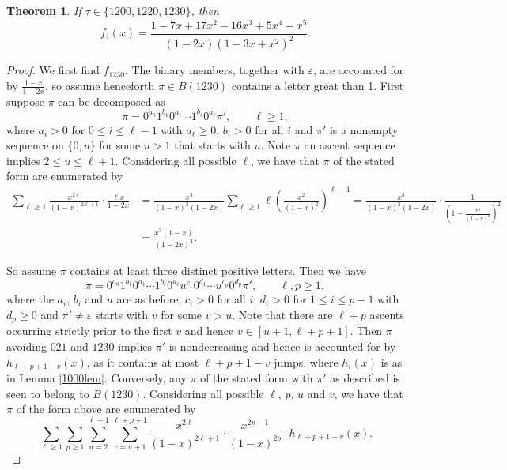 \documentclass{article}
\theoremstyle{remark}
\theoremstyle{plain}
\newtheorem{theorem}{Theorem}[section]
\begin{document}
\begin{theorem}\label{1200th}
If $\tau \in \{1200,1220,1230\}$, then
\begin{equation}\label{1200the1}
f_\tau(x)=\frac{1-7x+17x^2-16x^3+5x^4-x^5}{(1-2x)(1-3x+x^2)^2}.
\end{equation}
\end{theorem}
\begin{proof}
We first find $f_{1230}$. The binary members, together with $\varepsilon$, are accounted for by $\frac{1-x}{1-2x}$, so assume henceforth $\pi \in B(1230)$ contains a letter great than 1.  First suppose $\pi$ can be decomposed as
$$\pi=0^{a_0}1^{b_1}0^{a_1}\cdots 1^{b_\ell}0^{a_\ell}\pi', \qquad \ell \geq 1,$$
where $a_i>0$ for $0 \leq i \leq \ell-1$ with $a _\ell \geq0$, $b_i>0$ for all $i$ and $\pi'$ is a nonempty sequence on $\{0,u\}$ for some $u>1$ that starts with $u$.  Note $\pi$ an ascent sequence implies $2 \leq u \leq \ell+1$. Considering all possible $\ell$, we have that $\pi$ of the stated form are enumerated by
\begin{align*}
\sum_{\ell \geq 1}\frac{x^{2\ell}}{(1-x)^{2\ell+1}}\cdot\frac{\ell x}{1-2x}&=\frac{x^3}{(1-x)^3(1-2x)}\sum_{\ell \geq1}\ell\left(\frac{x^2}{(1-x)^2}\right)^{\ell-1}=\frac{x^3}{(1-x)^3(1-2x)}\cdot\frac{1}{\left(1-\frac{x^2}{(1-x)^2}\right)^2}\\
&=\frac{x^3(1-x)}{(1-2x)^3}.
\end{align*}

So assume $\pi$ contains at least three distinct positive letters.  Then we have
$$\pi=0^{a_0}1^{b_1}0^{a_1}\cdots1^{b_\ell}0^{a_{\ell}}u^{c_1}0^{d_1}\cdots u^{c_p}0^{d_p}\pi', \qquad \ell, p \geq 1,$$
where the $a_i$, $b_i$ and $u$ are as before, $c_i>0$ for all $i$, $d_i>0$ for $1 \leq i \leq p-1$ with $d_p\geq0$ and $\pi' \neq \varepsilon$ starts with $v$ for some $v>u$.  Note that there are $\ell+p$ ascents occurring strictly prior to the first $v$ and hence $v \in [u+1,\ell+p+1]$.  Then $\pi$ avoiding $021$ and $1230$ implies $\pi'$ is nondecreasing and hence is accounted for by $h_{\ell+p+1-v}(x)$, as it contains at most $\ell+p+1-v$ jumps, where $h_i(x)$ is as in Lemma \ref{1000lem}.  Conversely, any $\pi$ of the stated form with $\pi'$ as described is seen to belong to $B(1230)$. Considering all possible $\ell$, $p$, $u$ and $v$, we have that $\pi$ of the form above are enumerated by
$$\sum_{\ell \geq1}\sum_{p \geq1}\sum_{u=2}^{\ell+1}\sum_{v=u+1}^{\ell+p+1}\frac{x^{2\ell}}{(1-x)^{2\ell+1}}\cdot\frac{x^{2p-1}}{(1-x)^{2p}}\cdot h_{\ell+p+1-v}(x).$$


\end{proof}
\end{document}
